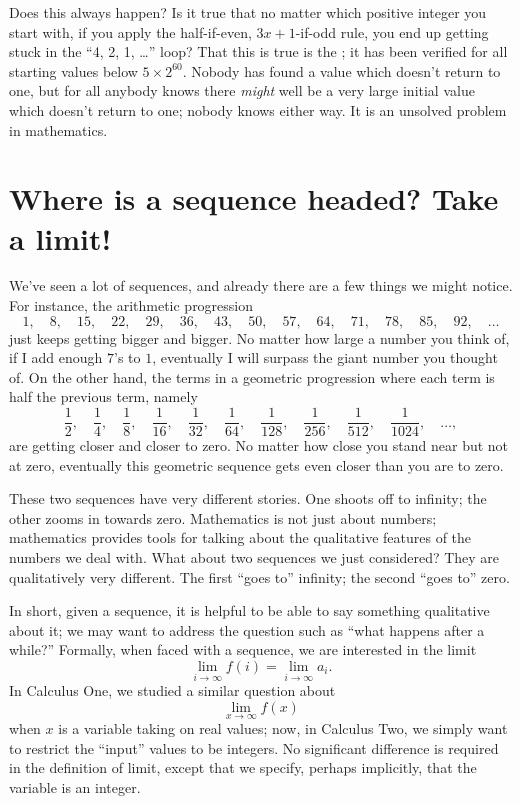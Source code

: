 Does this always happen?  Is it true that no matter which positive
integer you start with, if you apply the half-if-even, $3x+1$-if-odd
rule, you end up getting stuck in the ``4, 2, 1, \ldots'' loop?  That
this is true is the ; it has been
verified for all starting values below $5 \times 2^{60}$.  Nobody has
found a value which doesn't return to one, but for all anybody knows
there \textit{might} well be a very large initial value which doesn't
return to one; nobody knows either way.  It is an unsolved
problem in mathematics.

\section{Where is a sequence headed?  Take a limit!}

We've seen a lot of sequences, and already there are a few things we
might notice.  For instance, the arithmetic progression
$$
1,\quad 8,\quad 15,\quad 22,\quad 29,\quad 36,\quad 43,\quad 50,\quad 57,\quad 64,\quad 71,\quad 78,\quad 85,\quad 92,\quad \ldots
$$
just keeps getting bigger and bigger.  No matter how large a number
you think of, if I add enough $7$'s to $1$, eventually I will surpass
the giant number you thought of.  On the other hand, the terms in a geometric progression where each term is half the previous term, namely
$$
\frac{1}{2},\quad \frac{1}{4},\quad \frac{1}{8},\quad \frac{1}{16},\quad \frac{1}{32},\quad \frac{1}{64},\quad \frac{1}{128},\quad \frac{1}{256},\quad \frac{1}{512},\quad \frac{1}{1024},\quad \ldots ,
$$
are getting closer and closer to zero.  No matter how close you stand
near but not at zero, eventually this geometric sequence gets even closer than you
are to zero.

These two sequences have very different stories.  One shoots off to
infinity; the other zooms in towards zero.  Mathematics is not just
about numbers; mathematics provides tools for talking about the
qualitative features of the numbers we deal with.  What about two
sequences we just considered?  They are qualitatively very different.  The first ``goes to''
infinity; the second ``goes to'' zero.


In short, given a sequence, it is helpful to be able to say something
qualitative about it; we may want to address the question such as
``what happens after a while?'' Formally, when faced with a sequence,
we are interested in the limit
$$\lim_{i\to \infty} f(i) = \lim_{i\to\infty} a_i.$$
In Calculus One, we studied a similar question about
$$\lim_{x\to\infty} f(x)$$
when $x$ is a variable taking on real values; now, in Calculus Two, we
simply want to restrict the ``input'' values to be integers. No
significant difference is required in the definition of limit, except
that we specify, perhaps implicitly, that the variable is an integer.

